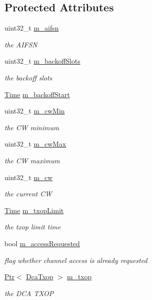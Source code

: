 \subsection*{Protected Attributes}
\begin{DoxyCompactItemize}
\item 
uint32\+\_\+t \hyperlink{classns3_1_1DcfState_aaf738fa407b0467722d15ca70713213d}{m\+\_\+aifsn}
\begin{DoxyCompactList}\small\item\em the A\+I\+F\+SN \end{DoxyCompactList}\item 
uint32\+\_\+t \hyperlink{classns3_1_1DcfState_aac983a544558935c606b6099e88aeb7f}{m\+\_\+backoff\+Slots}
\begin{DoxyCompactList}\small\item\em the backoff slots \end{DoxyCompactList}\item 
\hyperlink{classns3_1_1Time}{Time} \hyperlink{classns3_1_1DcfState_a311dab0ea8b81d0d9ac74bc3294957cd}{m\+\_\+backoff\+Start}
\item 
uint32\+\_\+t \hyperlink{classns3_1_1DcfState_aa74bf4018d28463df982732c59b59c89}{m\+\_\+cw\+Min}
\begin{DoxyCompactList}\small\item\em the CW minimum \end{DoxyCompactList}\item 
uint32\+\_\+t \hyperlink{classns3_1_1DcfState_aadd07edcf59493e63a00c4de179a650f}{m\+\_\+cw\+Max}
\begin{DoxyCompactList}\small\item\em the CW maximum \end{DoxyCompactList}\item 
uint32\+\_\+t \hyperlink{classns3_1_1DcfState_a62928225e740026ae4e8f185ee6d38d2}{m\+\_\+cw}
\begin{DoxyCompactList}\small\item\em the current CW \end{DoxyCompactList}\item 
\hyperlink{classns3_1_1Time}{Time} \hyperlink{classns3_1_1DcfState_adaa9613e0e1354eacdde7d9d6452d67a}{m\+\_\+txop\+Limit}
\begin{DoxyCompactList}\small\item\em the txop limit time \end{DoxyCompactList}\item 
bool \hyperlink{classns3_1_1DcfState_a1c3852e4b2e6bd880626598065c4eba2}{m\+\_\+access\+Requested}
\begin{DoxyCompactList}\small\item\em flag whether channel access is already requested \end{DoxyCompactList}\item 
\hyperlink{classns3_1_1Ptr}{Ptr}$<$ \hyperlink{classns3_1_1DcaTxop}{Dca\+Txop} $>$ \hyperlink{classns3_1_1DcfState_a58daee06113eff1a88d1dde9a79b4b74}{m\+\_\+txop}
\begin{DoxyCompactList}\small\item\em the D\+CA T\+X\+OP \end{DoxyCompactList}\end{DoxyCompactItemize}
